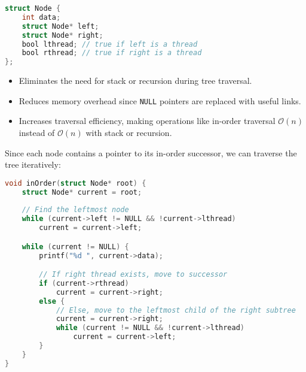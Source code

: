 \begin{lstlisting}[language=C]
struct Node {
    int data;
    struct Node* left;
    struct Node* right;
    bool lthread; // true if left is a thread
    bool rthread; // true if right is a thread
};
\end{lstlisting}

\begin{itemize}
    \item Eliminates the need for stack or recursion during tree traversal.
    \item Reduces memory overhead since \texttt{NULL} pointers are replaced with useful links.
    \item Increases traversal efficiency, making operations like in-order traversal \(\mathcal{O}(n)\) instead of \(\mathcal{O}(n)\) with stack or recursion.
\end{itemize}

Since each node contains a pointer to its in-order successor,
we can traverse the tree iteratively:

\begin{lstlisting}[language=C]
void inOrder(struct Node* root) {
    struct Node* current = root;
    
    // Find the leftmost node
    while (current->left != NULL && !current->lthread) 
        current = current->left;

    while (current != NULL) {
        printf("%d ", current->data);

        // If right thread exists, move to successor
        if (current->rthread)
            current = current->right;
        else {
            // Else, move to the leftmost child of the right subtree
            current = current->right;
            while (current != NULL && !current->lthread)
                current = current->left;
        }
    }
}
\end{lstlisting}